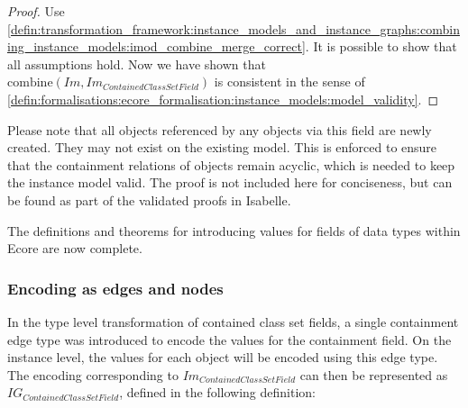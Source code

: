 \begin{proof}
Use \cref{defin:transformation_framework:instance_models_and_instance_graphs:combining_instance_models:imod_combine_merge_correct}. It is possible to show that all assumptions hold. Now we have shown that $\mathrm{combine}(Im, Im_{ContainedClassSetField})$ is consistent in the sense of \cref{defin:formalisations:ecore_formalisation:instance_models:model_validity}.
\end{proof}

Please note that all objects referenced by any objects via this field are newly created. They may not exist on the existing model. This is enforced to ensure that the containment relations of objects remain acyclic, which is needed to keep the instance model valid. The proof is not included here for conciseness, but can be found as part of the validated proofs in Isabelle.

The definitions and theorems for introducing values for fields of data types within Ecore are now complete. 

\subsubsection{Encoding as edges and nodes}

In the type level transformation of contained class set fields, a single containment edge type was introduced to encode the values for the containment field. On the instance level, the values for each object will be encoded using this edge type. The encoding corresponding to $Im_{ContainedClassSetField}$ can then be represented as $IG_{ContainedClassSetField}$, defined in the following definition:

